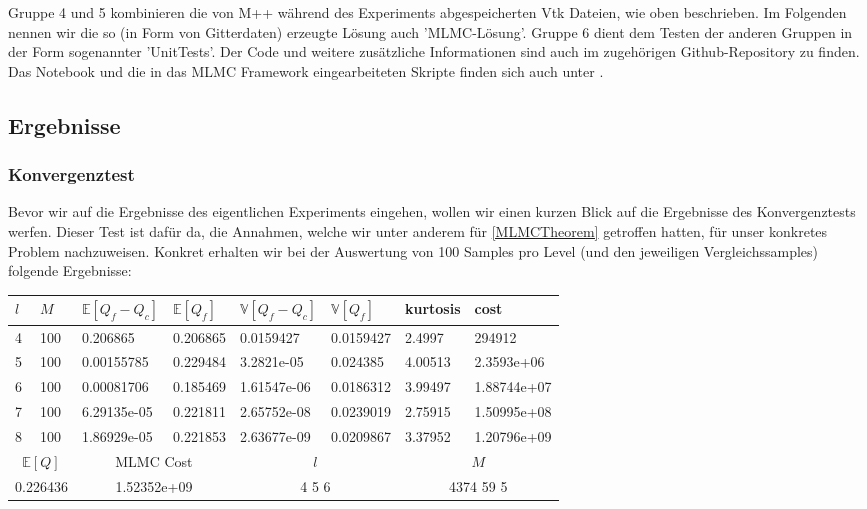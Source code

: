 Gruppe 4 und 5 kombinieren die von M++ während des Experiments abgespeicherten Vtk Dateien, wie oben beschrieben. Im Folgenden nennen wir die so (in Form von Gitterdaten) erzeugte Lösung auch 'MLMC-Lösung'.
Gruppe 6 dient dem Testen der anderen Gruppen in der Form sogenannter 'UnitTests'.
Der Code und weitere zusätzliche Informationen sind auch im zugehörigen Github-Repository \cite{githubvtk} zu finden. Das Notebook und die in das MLMC Framework eingearbeiteten Skripte finden sich auch unter \cite{branchMLMCTP}.

\subsection{Ergebnisse}
\subsubsection{Konvergenztest}
Bevor wir auf die Ergebnisse des eigentlichen Experiments eingehen, wollen wir einen kurzen Blick auf die Ergebnisse des Konvergenztests werfen. Dieser Test ist dafür da, die Annahmen, welche wir unter anderem für \eqref{MLMCTheorem} getroffen hatten, für unser konkretes Problem nachzuweisen.
Konkret erhalten wir bei der Auswertung von 100 Samples pro Level (und den jeweiligen Vergleichssamples) folgende Ergebnisse:

\newlength\q
\setlength{}
\noindent\begin{tabular}{|p{0.15\q}|p{0.55\q}|p{1.4\q}|p{1.05\q}|p{1.35\q}|p{1.25\q}|p{0.9\q}|p{1.35\q}|}
	\hline
	$ l $   &  $ M $  &  $ \mathbb{E}[Q_f-Q_c] $  &   $ \mathbb{E}[Q_f] $ &  $ \mathbb{V}[Q_f-Q_c] $   &   $ \mathbb{V}[Q_f] $ &  kurtosis    &    cost\\
	\hline
	4 &  100&    0.206865 &   0.206865&   0.0159427 &  0.0159427 &     2.4997&      294912 \\
	5 &  100&  0.00155785 &   0.229484&  3.2821e-05 &   0.024385 &    4.00513&  2.3593e+06 \\
	6 &  100&  0.00081706 &   0.185469& 1.61547e-06 &  0.0186312 &    3.99497& 1.88744e+07 \\
	7 &  100& 6.29135e-05 &   0.221811& 2.65752e-08 &  0.0239019 &    2.75915& 1.50995e+08 \\
	8 &  100& 1.86929e-05 &   0.221853& 2.63677e-09 &  0.0209867 &    3.37952& 1.20796e+09 \\
	\hline
	\multicolumn{2}{|c|}{$ \mathbb{E}[Q] $ }  &  \multicolumn{2}{c|}{MLMC Cost}   & \multicolumn{2}{c|}{$ l $}  &    \multicolumn{2}{c|}{$ M$} \\
	\hline
	\multicolumn{2}{|c|}{0.226436} & \multicolumn{2}{c|}{1.52352e+09  } &  \multicolumn{2}{c|}{   4 5 6 }     & \multicolumn{2}{c|}{4374 59 5}    \\
	\hline 
\end{tabular}\\

